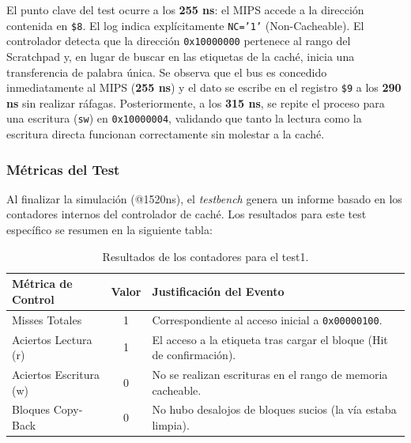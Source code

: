 \documentclass[12pt,a4paper]{article}
\begin{document}
El punto clave del test ocurre a los \textbf{255 ns}: el MIPS accede a la dirección contenida en \texttt{\$8}. El log indica explícitamente \texttt{NC='1'} (Non-Cacheable). El controlador detecta que la dirección \texttt{0x10000000} pertenece al rango del Scratchpad y, en lugar de buscar en las etiquetas de la caché, inicia una transferencia de palabra única. Se observa que el bus es concedido inmediatamente al MIPS (\textbf{255 ns}) y el dato se escribe en el registro \texttt{\$9} a los \textbf{290 ns} sin realizar ráfagas. Posteriormente, a los \textbf{315 ns}, se repite el proceso para una escritura (\texttt{sw}) en \texttt{0x10000004}, validando que tanto la lectura como la escritura directa funcionan correctamente sin molestar a la caché.


\subsubsection{Métricas del Test}

Al finalizar la simulación (@1520ns), el \textit{testbench} genera un informe basado en los contadores internos del controlador de caché. Los resultados para este test específico se resumen en la siguiente tabla:

\begin{table}[H]
\centering
\small
\renewcommand{\arraystretch}{1.2}
\begin{tabular}{|l|c|l|}
\hline
\rowcolor[HTML]{EFEFEF} 
\textbf{Métrica de Control} & \textbf{Valor} & \textbf{Justificación del Evento} \\ \hline
Misses Totales & 1 & Correspondiente al acceso inicial a \texttt{0x00000100}. \\ \hline
Aciertos Lectura (r) & 1 & El acceso a la etiqueta tras cargar el bloque (Hit de confirmación). \\ \hline
Aciertos Escritura (w) & 0 & No se realizan escrituras en el rango de memoria cacheable. \\ \hline
Bloques Copy-Back & 0 & No hubo desalojos de bloques sucios (la vía estaba limpia). \\ \hline
\end{tabular}
\caption{Resultados de los contadores para el test1.}
\label{tab:audit_test1}
\end{table}
\end{document}
